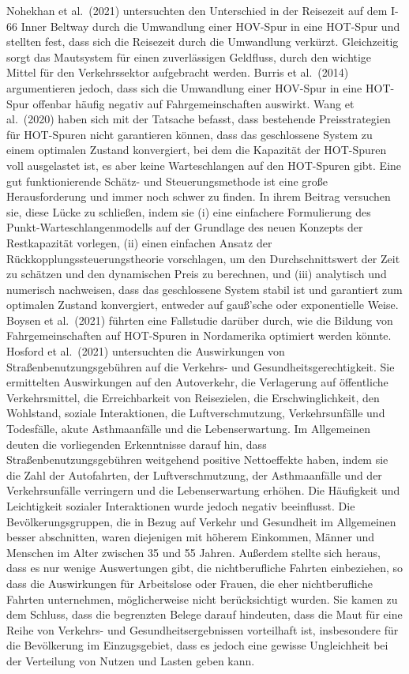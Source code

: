 \documentclass[
]{book}
\begin{document}
Nohekhan et al.~(2021) untersuchten den Unterschied in der Reisezeit auf dem I-66 Inner Beltway durch die Umwandlung einer HOV-Spur in eine HOT-Spur und stellten fest, dass sich die Reisezeit durch die Umwandlung verkürzt. Gleichzeitig sorgt das Mautsystem für einen zuverlässigen Geldfluss, durch den wichtige Mittel für den Verkehrssektor aufgebracht werden. Burris et al.~(2014) argumentieren jedoch, dass sich die Umwandlung einer HOV-Spur in eine HOT-Spur offenbar häufig negativ auf Fahrgemeinschaften auswirkt.
Wang et al.~(2020) haben sich mit der Tatsache befasst, dass bestehende Preisstrategien für HOT-Spuren nicht garantieren können, dass das geschlossene System zu einem optimalen Zustand konvergiert, bei dem die Kapazität der HOT-Spuren voll ausgelastet ist, es aber keine Warteschlangen auf den HOT-Spuren gibt. Eine gut funktionierende Schätz- und Steuerungsmethode ist eine große Herausforderung und immer noch schwer zu finden. In ihrem Beitrag versuchen sie, diese Lücke zu schließen, indem sie (i) eine einfachere Formulierung des Punkt-Warteschlangenmodells auf der Grundlage des neuen Konzepts der Restkapazität vorlegen, (ii) einen einfachen Ansatz der Rückkopplungssteuerungstheorie vorschlagen, um den Durchschnittswert der Zeit zu schätzen und den dynamischen Preis zu berechnen, und (iii) analytisch und numerisch nachweisen, dass das geschlossene System stabil ist und garantiert zum optimalen Zustand konvergiert, entweder auf gauß'sche oder exponentielle Weise. Boysen et al.~(2021) führten eine Fallstudie darüber durch, wie die Bildung von Fahrgemeinschaften auf HOT-Spuren in Nordamerika optimiert werden könnte.
Hosford et al.~(2021) untersuchten die Auswirkungen von Straßenbenutzungsgebühren auf die Verkehrs- und Gesundheitsgerechtigkeit. Sie ermittelten Auswirkungen auf den Autoverkehr, die Verlagerung auf öffentliche Verkehrsmittel, die Erreichbarkeit von Reisezielen, die Erschwinglichkeit, den Wohlstand, soziale Interaktionen, die Luftverschmutzung, Verkehrsunfälle und Todesfälle, akute Asthmaanfälle und die Lebenserwartung. Im Allgemeinen deuten die vorliegenden Erkenntnisse darauf hin, dass Straßenbenutzungsgebühren weitgehend positive Nettoeffekte haben, indem sie die Zahl der Autofahrten, der Luftverschmutzung, der Asthmaanfälle und der Verkehrsunfälle verringern und die Lebenserwartung erhöhen. Die Häufigkeit und Leichtigkeit sozialer Interaktionen wurde jedoch negativ beeinflusst. Die Bevölkerungsgruppen, die in Bezug auf Verkehr und Gesundheit im Allgemeinen besser abschnitten, waren diejenigen mit höherem Einkommen, Männer und Menschen im Alter zwischen 35 und 55 Jahren. Außerdem stellte sich heraus, dass es nur wenige Auswertungen gibt, die nichtberufliche Fahrten einbeziehen, so dass die Auswirkungen für Arbeitslose oder Frauen, die eher nichtberufliche Fahrten unternehmen, möglicherweise nicht berücksichtigt wurden. Sie kamen zu dem Schluss, dass die begrenzten Belege darauf hindeuten, dass die Maut für eine Reihe von Verkehrs- und Gesundheitsergebnissen vorteilhaft ist, insbesondere für die Bevölkerung im Einzugsgebiet, dass es jedoch eine gewisse Ungleichheit bei der Verteilung von Nutzen und Lasten geben kann.
\end{document}
